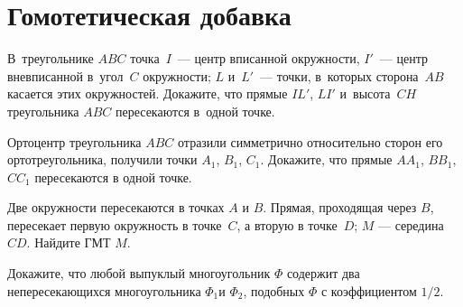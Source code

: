 
\section*{Гомотетическая добавка}


\begin{problems}

\item
В~треугольнике $ABC$ точка~$I$~--- центр вписанной окружности,
$I'$~--- центр вневписанной в~угол~$C$ окружности;
$L$ и~$L'$~--- точки, в~которых сторона~$AB$ касается этих окружностей.
Докажите, что прямые $IL'$, $LI'$ и~высота~$CH$ треугольника $ABC$ пересекаются
в~одной точке.

\item
Ортоцентр треугольника $ABC$ отразили симметрично относительно сторон его
ортотреугольника, получили точки $A_1$, $B_1$, $C_1$.
Докажите, что прямые $A A_1$, $B B_1$, $C C_1$ пересекаются в одной точке.

\item
Две окружности пересекаются в точках $A$ и $B$.
Прямая, проходящая через $B$, пересекает первую окружность в точке~$C$,
а вторую в точке~$D$; $M$ --- середина~$CD$.
Найдите ГМТ $M$.

\item
Докажите, что любой выпуклый многоугольник $\Phi$ содержит два непересекающихся
многоугольника $\Phi_1$и $\Phi_2$, подобных $\Phi$ с коэффициентом $1/2$.

\end{problems}

